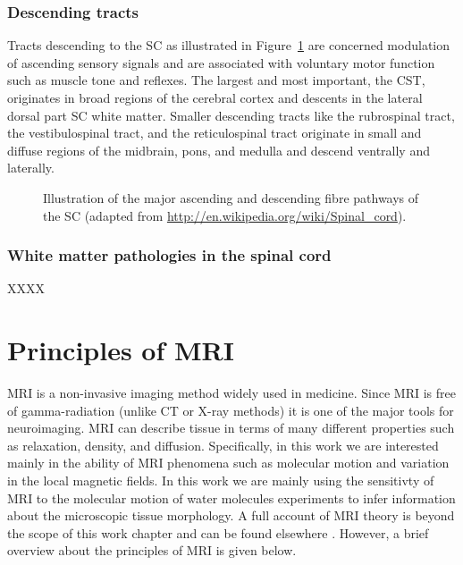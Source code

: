\subsubsection*{Descending tracts}
\label{sec:chap2:descendingtracts}
Tracts descending to the {\gls{SC}} as illustrated in Figure~\ref{fig:chapter 2 spinal_cord_anatomy} are concerned modulation of ascending sensory signals and are associated with voluntary motor function such as muscle tone and reflexes. The largest and most important, the {\gls{CST}}, originates in broad regions of the cerebral cortex and descents in the lateral dorsal part {\gls{SC}} white matter. Smaller descending tracts like the rubrospinal tract, the vestibulospinal tract, and the reticulospinal tract originate in small and diffuse regions of the midbrain, pons, and medulla and descend ventrally and laterally.
\begin{figure}
 \centering
  \caption{Illustration of the major ascending and descending fibre pathways of the {\protect\gls{SC}} (adapted from \url{http://en.wikipedia.org/wiki/Spinal_cord}).}
  \label{fig:chapter 2 spinal_cord_anatomy}
\end{figure}
\subsubsection*{White matter pathologies in the spinal cord}
XXXX

\section{Principles of MRI}
\Gls{MRI} is a non-invasive imaging method widely used in medicine. Since \gls{MRI} is free of gamma-radiation (unlike CT or X-ray methods) it is one of the major tools for neuroimaging. \Gls{MRI} can describe tissue in terms of many different properties such as relaxation, density, and diffusion. Specifically, in this work we are interested mainly in the ability of MRI phenomena such as molecular motion and variation in the local magnetic fields. In this work we are mainly using the sensitivty of MRI to the molecular motion of water molecules experiments to infer information about the microscopic tissue morphology. A full account of MRI theory is beyond the scope of this work chapter and can be found elsewhere \citep{MRI Books}. However, a brief overview about the principles of \gls{MRI} is given below.
